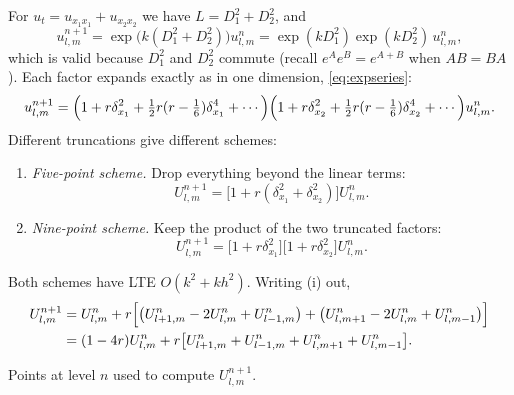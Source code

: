 \documentclass[11pt,a4paper]{article}
\numberwithin{equation}{section}
\theoremstyle{spacedplain}
\theoremstyle{spaceddefinition}
\theoremstyle{spacedremark}
\begin{document}
For \(u_t=u_{x_1x_1}+u_{x_2x_2}\) we have \(L=D_1^2+D_2^2\), and
\[
  u_{l,m}^{n+1}=\exp\bigl(k(D_1^2+D_2^2)\bigr)u_{l,m}^n
  =\exp(kD_1^2)\exp(kD_2^2)\,u_{l,m}^n,
\]
which is valid because \(D_1^2\) and \(D_2^2\) commute (recall
\(e^Ae^B=e^{A+B}\) when \(AB=BA\)).  Each factor expands exactly as in
one dimension, \eqref{eq:expseries}:
\[
  u_{l,m}^{n+1}
  =\Bigl(1+r\delta_{x_1}^2+\tfrac12r(r-\tfrac16)\delta_{x_1}^4+\cdots\Bigr)
   \Bigl(1+r\delta_{x_2}^2+\tfrac12r(r-\tfrac16)\delta_{x_2}^4+\cdots\Bigr)
   u_{l,m}^n.
\]
Different truncations give different schemes:
\begin{enumerate}[label=(\roman*)]
  \item \emph{Five-point scheme.}  Drop everything beyond the linear
    terms:
    \[
      U_{l,m}^{n+1}=\bigl[1+r(\delta_{x_1}^2+\delta_{x_2}^2)\bigr]U_{l,m}^n.
    \]
  \item \emph{Nine-point scheme.}  Keep the product of the two
    truncated factors:
    \[
      U_{l,m}^{n+1}=\bigl[1+r\delta_{x_1}^2\bigr]\bigl[1+r\delta_{x_2}^2\bigr]U_{l,m}^n.
    \]
\end{enumerate}
Both schemes have LTE \(O(k^2+kh^2)\).  Writing (i) out,
\begin{align}
  U_{l,m}^{n+1}
  &=U_{l,m}^n+r\Bigl[\bigl(U_{l+1,m}^n-2U_{l,m}^n+U_{l-1,m}^n\bigr)
    +\bigl(U_{l,m+1}^n-2U_{l,m}^n+U_{l,m-1}^n\bigr)\Bigr]\notag\\
  &=(1-4r)U_{l,m}^n+r\bigl[U_{l+1,m}^n+U_{l-1,m}^n+U_{l,m+1}^n
    +U_{l,m-1}^n\bigr]. \label{eq:five2d}
\end{align}

\begin{center}

\small Points at level \(n\) used to compute \(U_{l,m}^{n+1}\).
\end{center}
\end{document}
